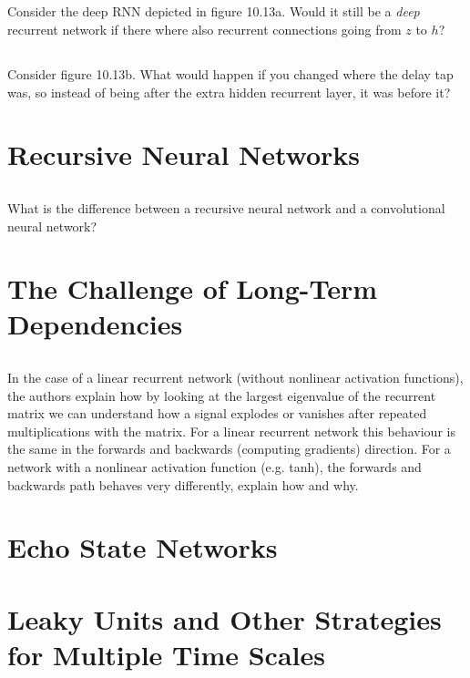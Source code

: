 \documentclass[a4paper]{report}
\begin{document}
    \subsection{}
    Consider the deep RNN depicted in figure 10.13a. Would it still be a \emph{deep} recurrent network if there where also recurrent connections going from $z$ to $h$?
    \subsection{}
    Consider figure 10.13b. What would happen if you changed where the delay tap was, so instead of being after the extra hidden recurrent layer, it was before it?

    \section{Recursive Neural Networks}
    \subsection{}
    What is the difference between a recursive neural network and a convolutional neural network?

    \section{The Challenge of Long-Term Dependencies}
    \subsection{}
    In the case of a linear recurrent network (without nonlinear activation functions), the authors explain how by looking at the largest eigenvalue of the recurrent matrix we can understand how a signal explodes or vanishes after repeated multiplications with the matrix. For a linear recurrent network this behaviour is the same in the forwards and backwards (computing gradients) direction. For a network with a nonlinear activation function (e.g. tanh), the forwards and backwards path behaves very differently, explain how and why.

    \section{Echo State Networks}

    \section{Leaky Units and Other Strategies for Multiple Time Scales}
\end{document}
